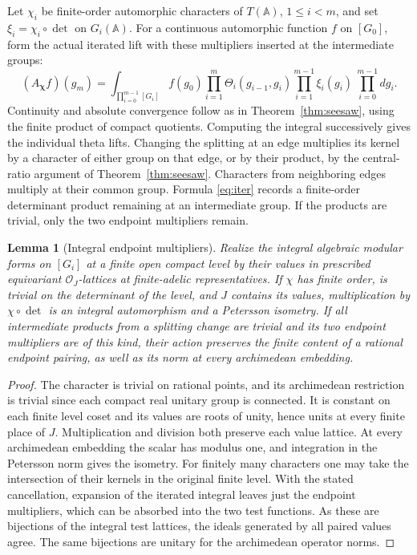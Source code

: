 \documentclass[a4paper,11pt]{article}
\newtheorem{lemma}[proposition]{Lemma}
\theoremstyle{definition}
\theoremstyle{remark}
\numberwithin{equation}{section}
\newcommand{\OO}{\mathcal O}
\begin{document}
Let \(\chi_i\) be finite-order automorphic characters of \(T(\mathbb A)\), \(1\le i<m\), and set \(\xi_i=\chi_i\circ\det\) on \(G_i(\mathbb A)\). For a continuous automorphic function \(f\) on \([G_0]\), form the actual iterated lift with these multipliers inserted at the intermediate groups:
\begin{equation}
 (A_{\boldsymbol\chi}f)(g_m)=
 \int_{\prod_{i=0}^{m-1}[G_i]}
 f(g_0)\prod_{i=1}^m\Theta_i(g_{i-1},g_i)
                 \prod_{i=1}^{m-1}\xi_i(g_i)\ \prod_{i=0}^{m-1}dg_i .
 \label{eq:iter}
\end{equation}
Continuity and absolute convergence follow as in Theorem~\ref{thm:seesaw}, using the finite product of compact quotients. Computing the integral successively gives the individual theta lifts. Changing the splitting at an edge multiplies its kernel by a character of either group on that edge, or by their product, by the central-ratio argument of Theorem~\ref{thm:seesaw}. Characters from neighboring edges multiply at their common group. Formula \eqref{eq:iter} records a finite-order determinant product remaining at an intermediate group. If the products are trivial, only the two endpoint multipliers remain.

\begin{lemma}[Integral endpoint multipliers]\label{lem:multi}
Realize the integral algebraic modular forms on \([G_i]\) at a finite open compact level by their values in prescribed equivariant \(\OO_J\)-lattices at finite-adelic representatives. If \(\chi\) has finite order, is trivial on the determinant of the level, and \(J\) contains its values, multiplication by \(\chi\circ\det\) is an integral automorphism and a Petersson isometry. If all intermediate products from a splitting change are trivial and its two endpoint multipliers are of this kind, their action preserves the finite content of a rational endpoint pairing, as well as its norm at every archimedean embedding.
\end{lemma}
\begin{proof}
The character is trivial on rational points, and its archimedean restriction is trivial since each compact real unitary group is connected. It is constant on each finite level coset and its values are roots of unity, hence units at every finite place of \(J\). Multiplication and division both preserve each value lattice. At every archimedean embedding the scalar has modulus one, and integration in the Petersson norm gives the isometry. For finitely many characters one may take the intersection of their kernels in the original finite level. With the stated cancellation, expansion of the iterated integral leaves just the endpoint multipliers, which can be absorbed into the two test functions. As these are bijections of the integral test lattices, the ideals generated by all paired values agree. The same bijections are unitary for the archimedean operator norms.
\end{proof}
\end{document}
